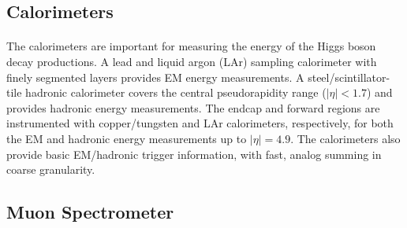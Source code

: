 \subsection{Calorimeters}
\paragraph{}
The calorimeters are important for measuring the energy of the Higgs boson decay productions.
A lead and liquid argon (LAr) sampling calorimeter with finely segmented layers provides EM energy measurements.
A steel/scintillator-tile hadronic calorimeter covers the central pseudorapidity range ($|\eta| < 1.7$) and provides hadronic energy measurements.
The endcap and forward regions are instrumented with copper/tungsten and LAr calorimeters, respectively, for both the EM and hadronic energy measurements up to $|\eta| = 4.9$. 
The calorimeters also provide basic EM/hadronic trigger information, with fast, analog summing in coarse granularity.



\subsection{Muon Spectrometer}

